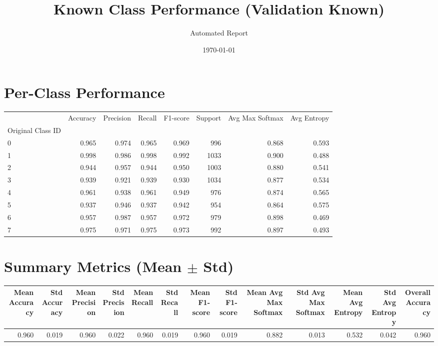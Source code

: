 \documentclass{article}
\title{Known Class Performance (Validation Known)}
\date{\today}
\author{Automated Report}
\begin{document}
\maketitle
\section*{Per-Class Performance}
\begin{tabular}{lrrrrrrr}
\toprule
 & Accuracy & Precision & Recall & F1-score & Support & Avg Max Softmax & Avg Entropy \\
Original Class ID &  &  &  &  &  &  &  \\
\midrule
0 & 0.965 & 0.974 & 0.965 & 0.969 & 996 & 0.868 & 0.593 \\
1 & 0.998 & 0.986 & 0.998 & 0.992 & 1033 & 0.900 & 0.488 \\
2 & 0.944 & 0.957 & 0.944 & 0.950 & 1003 & 0.880 & 0.541 \\
3 & 0.939 & 0.921 & 0.939 & 0.930 & 1034 & 0.877 & 0.534 \\
4 & 0.961 & 0.938 & 0.961 & 0.949 & 976 & 0.874 & 0.565 \\
5 & 0.937 & 0.946 & 0.937 & 0.942 & 954 & 0.864 & 0.575 \\
6 & 0.957 & 0.987 & 0.957 & 0.972 & 979 & 0.898 & 0.469 \\
7 & 0.975 & 0.971 & 0.975 & 0.973 & 992 & 0.897 & 0.493 \\
\bottomrule
\end{tabular}
\section*{Summary Metrics (Mean $\pm$ Std)}
\begin{tabular}{rrrrrrrrrrrrr}
\toprule
Mean Accuracy & Std Accuracy & Mean Precision & Std Precision & Mean Recall & Std Recall & Mean F1-score & Std F1-score & Mean Avg Max Softmax & Std Avg Max Softmax & Mean Avg Entropy & Std Avg Entropy & Overall Accuracy \\
\midrule
0.960 & 0.019 & 0.960 & 0.022 & 0.960 & 0.019 & 0.960 & 0.019 & 0.882 & 0.013 & 0.532 & 0.042 & 0.960 \\
\bottomrule
\end{tabular}
\end{document}
